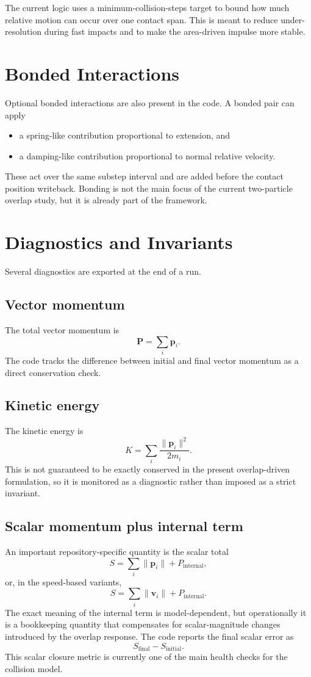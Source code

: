 \documentclass[11pt]{article}
\begin{document}
The current logic uses a minimum-collision-steps target to bound how much relative motion can occur over one contact span. This is meant to reduce under-resolution during fast impacts and to make the area-driven impulse more stable.

\section{Bonded Interactions}
Optional bonded interactions are also present in the code. A bonded pair can apply
\begin{itemize}[leftmargin=1.5em]
    \item a spring-like contribution proportional to extension, and
    \item a damping-like contribution proportional to normal relative velocity.
\end{itemize}
These act over the same substep interval and are added before the contact position writeback. Bonding is not the main focus of the current two-particle overlap study, but it is already part of the framework.

\section{Diagnostics and Invariants}
Several diagnostics are exported at the end of a run.

\subsection{Vector momentum}
The total vector momentum is
\[
    \mathbf{P} = \sum_i \mathbf{p}_i.
\]
The code tracks the difference between initial and final vector momentum as a direct conservation check.

\subsection{Kinetic energy}
The kinetic energy is
\[
    K = \sum_i \frac{\|\mathbf{p}_i\|^2}{2m_i}.
\]
This is not guaranteed to be exactly conserved in the present overlap-driven formulation, so it is monitored as a diagnostic rather than imposed as a strict invariant.

\subsection{Scalar momentum plus internal term}
An important repository-specific quantity is the scalar total
\[
    S = \sum_i \|\mathbf{p}_i\| + P_{\text{internal}},
\]
or, in the speed-based variants,
\[
    S = \sum_i \|\mathbf{v}_i\| + P_{\text{internal}}.
\]
The exact meaning of the internal term is model-dependent, but operationally it is a bookkeeping quantity that compensates for scalar-magnitude changes introduced by the overlap response. The code reports the final scalar error as
\[
    S_{\text{final}} - S_{\text{initial}}.
\]
This scalar closure metric is currently one of the main health checks for the collision model.
\end{document}
